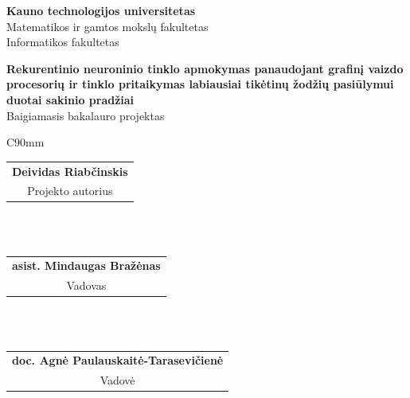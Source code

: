 

\begin{titlepage}
  \begin{center}


    \begin{figure}[H]
      \centering
    \end{figure}

    \vspace*{30pt}

    \fontXII
    \textbf{Kauno technologijos universitetas}\\
    Matematikos ir gamtos mokslų fakultetas\\
    Informatikos fakultetas

    \vspace*{100pt}

    \fontXVIII
	   \textbf{Rekurentinio neuroninio tinklo apmokymas panaudojant grafinį vaizdo procesorių ir tinklo pritaikymas labiausiai tikėtinų žodžių pasiūlymui duotai sakinio pradžiai}\\
     \fontXIV
     Baigiamasis bakalauro projektas

     \vspace*{76.8pt}

     \fontXII

     \singlespacing
     \begin{table}[H]
       \centering
      \begin{tabular}{C{90mm}}
      \hline
       \\
      \begin{tabular}{@{}c@{}}\textbf{Deividas Riabčinskis}\\Projekto autorius\end{tabular} \\
       \\
      \begin{tabular}{@{}c@{}}\textbf{asist. Mindaugas Bražėnas}\\Vadovas\end{tabular} \\
       \\
        \begin{tabular}{@{}c@{}}\textbf{doc. Agnė Paulauskaitė-Tarasevičienė}\\Vadovė\end{tabular} \\
       \\ \hline
      \end{tabular}
    \end{table}


\end{center}
\end{titlepage}

